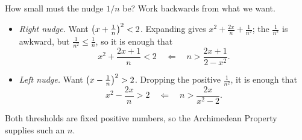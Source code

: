 \begin{scratch}
    How small must the nudge $1/n$ be? Work backwards from what we want.
    \begin{itemize}
        \item \emph{Right nudge.} Want $\left(x+\frac1n\right)^2<2$. Expanding gives $x^2+\frac{2x}{n}+\frac1{n^2}$; the $\frac1{n^2}$ is awkward, but $\frac1{n^2}\leq\frac1n$, so it is enough that
        \[
            x^2+\frac{2x+1}{n}<2
            \quad\Longleftarrow\quad
            n>\frac{2x+1}{2-x^2}.
        \]
        \item \emph{Left nudge.} Want $\left(x-\frac1n\right)^2>2$. Dropping the positive $\frac1{n^2}$, it is enough that
        \[
            x^2-\frac{2x}{n}>2
            \quad\Longleftarrow\quad
            n>\frac{2x}{x^2-2}.
        \]
    \end{itemize}
    Both thresholds are fixed positive numbers, so the Archimedean Property supplies such an $n$.
\end{scratch}

